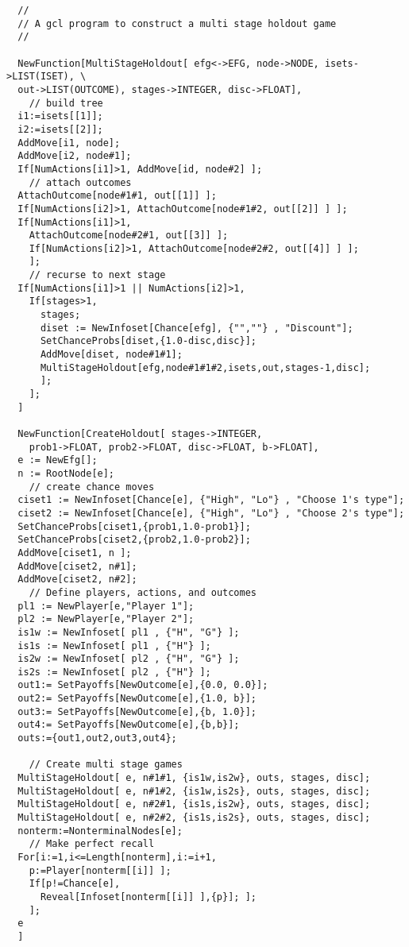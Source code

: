 {\scriptsize 
\begin{verbatim}
  //
  // A gcl program to construct a multi stage holdout game
  //

  NewFunction[MultiStageHoldout[ efg<->EFG, node->NODE, isets->LIST(ISET), \
  out->LIST(OUTCOME), stages->INTEGER, disc->FLOAT],
    // build tree
  i1:=isets[[1]];
  i2:=isets[[2]];
  AddMove[i1, node];
  AddMove[i2, node#1];
  If[NumActions[i1]>1, AddMove[id, node#2] ];
    // attach outcomes
  AttachOutcome[node#1#1, out[[1]] ]; 
  If[NumActions[i2]>1, AttachOutcome[node#1#2, out[[2]] ] ];
  If[NumActions[i1]>1, 
    AttachOutcome[node#2#1, out[[3]] ];
    If[NumActions[i2]>1, AttachOutcome[node#2#2, out[[4]] ] ];
    ];
    // recurse to next stage
  If[NumActions[i1]>1 || NumActions[i2]>1,
    If[stages>1,
      stages;
      diset := NewInfoset[Chance[efg], {"",""} , "Discount"];
      SetChanceProbs[diset,{1.0-disc,disc}];
      AddMove[diset, node#1#1];
      MultiStageHoldout[efg,node#1#1#2,isets,out,stages-1,disc];
      ];
    ];
  ]

  NewFunction[CreateHoldout[ stages->INTEGER,
    prob1->FLOAT, prob2->FLOAT, disc->FLOAT, b->FLOAT],
  e := NewEfg[];
  n := RootNode[e];
    // create chance moves
  ciset1 := NewInfoset[Chance[e], {"High", "Lo"} , "Choose 1's type"];
  ciset2 := NewInfoset[Chance[e], {"High", "Lo"} , "Choose 2's type"];
  SetChanceProbs[ciset1,{prob1,1.0-prob1}];
  SetChanceProbs[ciset2,{prob2,1.0-prob2}];
  AddMove[ciset1, n ];
  AddMove[ciset2, n#1];
  AddMove[ciset2, n#2];
    // Define players, actions, and outcomes
  pl1 := NewPlayer[e,"Player 1"];
  pl2 := NewPlayer[e,"Player 2"];
  is1w := NewInfoset[ pl1 , {"H", "G"} ];
  is1s := NewInfoset[ pl1 , {"H"} ];
  is2w := NewInfoset[ pl2 , {"H", "G"} ];
  is2s := NewInfoset[ pl2 , {"H"} ];
  out1:= SetPayoffs[NewOutcome[e],{0.0, 0.0}];
  out2:= SetPayoffs[NewOutcome[e],{1.0, b}];
  out3:= SetPayoffs[NewOutcome[e],{b, 1.0}];
  out4:= SetPayoffs[NewOutcome[e],{b,b}];
  outs:={out1,out2,out3,out4};

    // Create multi stage games
  MultiStageHoldout[ e, n#1#1, {is1w,is2w}, outs, stages, disc];
  MultiStageHoldout[ e, n#1#2, {is1w,is2s}, outs, stages, disc];
  MultiStageHoldout[ e, n#2#1, {is1s,is2w}, outs, stages, disc];
  MultiStageHoldout[ e, n#2#2, {is1s,is2s}, outs, stages, disc];
  nonterm:=NonterminalNodes[e];
    // Make perfect recall 
  For[i:=1,i<=Length[nonterm],i:=i+1,
    p:=Player[nonterm[[i]] ];
    If[p!=Chance[e],
      Reveal[Infoset[nonterm[[i]] ],{p}]; ];
    ];	 
  e
  ]
\end{verbatim}
}

